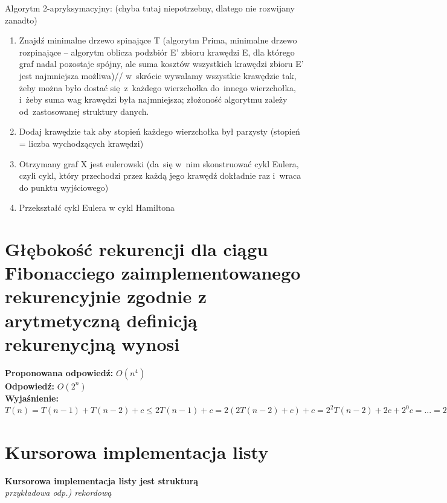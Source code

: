 Algorytm 2-apryksymacyjny: (chyba tutaj niepotrzebny, dlatego nie rozwijany zanadto)
\begin{enumerate}
	\item Znajdź minimalne drzewo spinające T (algorytm Prima, minimalne drzewo rozpinające -- algorytm oblicza podzbiór E' zbioru krawędzi E, dla którego graf nadal pozostaje spójny, ale suma kosztów wszystkich krawędzi zbioru E' jest najmniejsza możliwa)//
	w~skrócie wywalamy wszystkie krawędzie tak, żeby można było dostać się~z~każdego wierzchołka do~innego wierzchołka, i~żeby suma wag krawędzi była najmniejsza; złożoność algorytmu zależy od~zastosowanej struktury danych.
	\item Dodaj krawędzie tak aby stopień każdego wierzchołka był parzysty (stopień = liczba wychodzących krawędzi)
	\item Otrzymany graf  X jest eulerowski (da~się w~nim skonstruować cykl Eulera, czyli cykl, który przechodzi przez każdą jego krawędź dokładnie raz i~wraca do punktu wyjściowego)
	\item Przekształć cykl Eulera w cykl Hamiltona
\end{enumerate}


\section{Głębokość rekurencji dla ciągu Fibonacciego zaimplementowanego rekurencyjnie zgodnie z arytmetyczną definicją rekurenycjną wynosi}

\vspace{0.4cm}
\noindent \textbf{Proponowana odpowiedź:} $O(n^4)$ \\ 

\noindent \textbf{Odpowiedź:} $O(2^n)$ \\

\noindent \textbf{Wyjaśnienie:}
$T(n) = T(n-1) + T(n-2) + c \leq 2T(n-1) + c = 2(2T(n-2) + c) + c = 2^2T(n-2) + 2c + 2^0c =...= 2^nT(0) + 2^{n-1}c + ... + 2c + 2^0c = c(2^n-1)$ \\


\section{Kursorowa implementacja listy}
\textbf{Kursorowa implementacja listy jest strukturą}\\
\textit{przykładowa odp.) rekordową}

\vspace{0.4cm}


